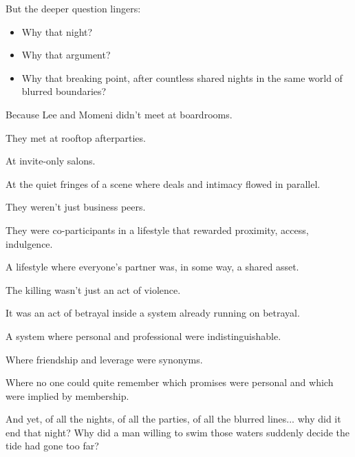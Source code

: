 \begin{tcolorbox}[colback=gray!5!white, colframe=gray!50!black, breakable, title={Historical Sidebar: Bob Lee, the Lifestyle, and the Price of Admission}]
  But the deeper question lingers:

  \medskip
  
  \begin{itemize}
    \item Why that night?
    \item Why that argument?
    \item Why that breaking point, after countless shared nights in the same world of blurred boundaries?
  \end{itemize}
  
  \medskip
  
  Because Lee and Momeni didn’t meet at boardrooms.

  \medskip
  
  They met at rooftop afterparties.

  \medskip
  
  At invite-only salons.

  \medskip
  
  At the quiet fringes of a scene where deals and intimacy flowed in parallel.

  \medskip
  
  They weren’t just business peers.

  \medskip
  
  They were co-participants in a lifestyle that rewarded proximity, access, indulgence.

  \medskip
  
  A lifestyle where everyone’s partner was, in some way, a shared asset.
  
  \medskip
  
  The killing wasn’t just an act of violence.

  \medskip
  
  It was an act of betrayal inside a system already running on betrayal.

  \medskip
  
  A system where personal and professional were indistinguishable.

  \medskip
  
  Where friendship and leverage were synonyms.

  \medskip
  
  Where no one could quite remember which promises were personal and which were implied by membership.
  
  \medskip
  
  And yet, of all the nights, of all the parties, of all the blurred lines... why did it end that night?  Why did a man willing to swim those waters suddenly decide the tide had gone too far?


\end{tcolorbox}
